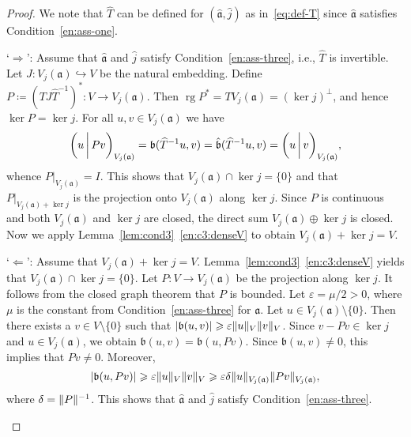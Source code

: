 \documentclass[a4paper,oneside,12pt]{amsart}
\theoremstyle{plain}
\theoremstyle{definition}
\let\ge=\geqslant
\DeclarePairedDelimiter\norm{\lVert}{\rVert}
\DeclarePairedDelimiter\abs{\lvert}{\rvert}
\begin{document}
\begin{proof}
We note that $\widehat{T}$ can be defined for $({{\mathfrak{{\hat{a}}}}},\hat{j})$ as in~\eqref{eq:def-T} since ${{\mathfrak{{\hat{a}}}}}$ satisfies Condition~\ref{en:ass-one}.
\begin{asparaenum}
\item[`$\Rightarrow$':] Assume that ${{\mathfrak{{\hat{a}}}}}$ and $\hat{j}$ satisfy Condition~\ref{en:ass-three}, i.e., $\widehat{T}$ is invertible.
Let $J\colon V_j({{\mathfrak{{a}}}})\hookrightarrow V$ be the natural embedding.
Define $P\coloneqq (TJ\widehat{T}^{-1})^*\colon V\to V_j({{\mathfrak{{a}}}})$. 
Then $\operatorname{rg} P^* = T V_j({{\mathfrak{{a}}}}) = (\ker j)^\perp$, and hence $\ker P=\ker j$.
For all $u,v\in V_j({{\mathfrak{{a}}}})$ we have
\[
    {{\ifthenelse{\equal{auto}{auto}}{\left({u}\mkern3mu{\biggm|}\mkern3mu {Pv}\right)}{}
\ifthenelse{\equal{auto}{b}}{\bigl({u}\mkern3mu{\biggm|}\mkern3mu {Pv}\bigr)}{}
\ifthenelse{\equal{auto}{B}}{\Bigl({u}\mkern3mu{\bigm|}\mkern3mu {Pv}\Bigr)}{}
}}_{V_j({{\mathfrak{{a}}}})} = {{\mathfrak{{b}}}}(\widehat{T}^{-1}u,v)={{\mathfrak{{\hat{b}}}}}(\widehat{T}^{-1}u,v)={{\ifthenelse{\equal{auto}{auto}}{\left({u}\mkern3mu{\biggm|}\mkern3mu {v}\right)}{}
\ifthenelse{\equal{auto}{b}}{\bigl({u}\mkern3mu{\biggm|}\mkern3mu {v}\bigr)}{}
\ifthenelse{\equal{auto}{B}}{\Bigl({u}\mkern3mu{\bigm|}\mkern3mu {v}\Bigr)}{}
}}_{V_j({{\mathfrak{{a}}}})},
\]
whence ${\ensuremath{{P}|_{{V_j({{\mathfrak{{a}}}})}}}}=I$. 
This shows that $V_j({{\mathfrak{{a}}}})\cap\ker j=\{0\}$ and that ${\ensuremath{{P}|_{{V_j({{\mathfrak{{a}}}})+\ker j}}}}$
is the projection onto $V_j({{\mathfrak{{a}}}})$ along $\ker j$. 
Since $P$ is continuous and both $V_j({{\mathfrak{{a}}}})$ and $\ker j$ are closed,
the direct sum $V_j({{\mathfrak{{a}}}})\oplus\ker j$ is closed.
Now we apply Lemma~\ref{lem:cond3}~\ref{en:c3:denseV} to obtain $V_j({{\mathfrak{{a}}}})+\ker j=V$.

\item[`$\Leftarrow$':] Assume that $V_j({{\mathfrak{{a}}}})+\ker j=V$. 
Lemma~\ref{lem:cond3}~\ref{en:c3:denseV} yields that $V_j({{\mathfrak{{a}}}})\cap\ker j=\{0\}$.
Let $P\colon V\to V_j({{\mathfrak{{a}}}})$ be the projection along $\ker j$. 
It follows from the closed graph theorem that $P$ is bounded.
Let ${\varepsilon}=\mu/2>0$, where $\mu$ is the constant from Condition~\ref{en:ass-three} for ${{\mathfrak{{a}}}}$.
Let $u\in V_j({{\mathfrak{{a}}}})\setminus\{0\}$. Then there exists a $v\in V\setminus\{0\}$ such that
$\abs{{{\mathfrak{{b}}}}(u,v)}\ge{\varepsilon}\norm{u}_V\norm{v}_V$. Since $v-Pv\in\ker j$ and $u\in V_j({{\mathfrak{{a}}}})$, we obtain ${{\mathfrak{{b}}}}(u,v)={{\mathfrak{{b}}}}(u,Pv)$.
Since ${{\mathfrak{{b}}}}(u,v)\ne 0$, this implies that $Pv\ne 0$. Moreover,
\[
    \abs{{{\mathfrak{{b}}}}(u,Pv)}\ge{\varepsilon}\norm{u}_V\norm{v}_V\ge {\varepsilon}\delta\norm{u}_{V_j({{\mathfrak{{a}}}})}\norm{Pv}_{V_j({{\mathfrak{{a}}}})},
\]
where $\delta=\norm{P}^{-1}$. This shows that ${{\mathfrak{{\hat{a}}}}}$ and $\hat{j}$ satisfy Condition~\ref{en:ass-three}.\qedhere
\end{asparaenum}
\end{proof}
\end{document}
